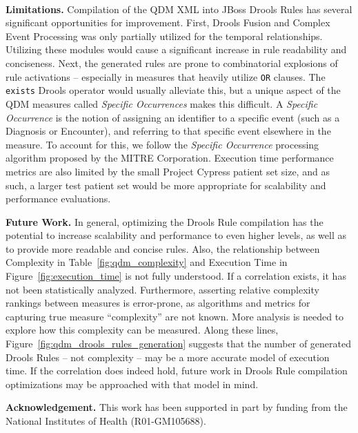 \documentclass{amia}
\begin{document}
\textbf{Limitations.}
Compilation of the QDM XML into JBoss\textsuperscript{\textregistered} Drools Rules has several significant opportunities for improvement. First, Drools Fusion and Complex Event Processing\cite{bali2013drools} was only partially utilized for the temporal relationships. Utilizing these modules would cause a significant increase in rule readability and conciseness. Next, the generated rules are prone to combinatorial explosions of rule activations -- especially in measures that heavily utilize \texttt{OR} clauses. The \texttt{exists} Drools operator would usually alleviate this, but a unique aspect of the QDM measures called \textit{Specific Occurrences} makes this difficult. A \textit{Specific Occurrence} is the notion of assigning an identifier to a specific event (such as a Diagnosis or Encounter), and referring to that specific event elsewhere in the measure. To account for this, we follow the \textit{Specific Occurrence} processing algorithm proposed by the MITRE Corporation\cite{specific_occurences}.
Execution time performance metrics are also limited by the small Project Cypress patient set size, and as such, a larger test patient set would be more appropriate for scalability and performance evaluations.

\textbf{Future Work.}
In general, optimizing the Drools Rule compilation has the potential to increase scalability and performance to even higher levels, as well as to provide more readable and concise rules.
Also, the relationship between Complexity in Table~\ref{fig:qdm_complexity} and Execution Time in Figure~\ref{fig:execution_time} is not fully understood. If a correlation exists, it has not been statistically analyzed. Furthermore, asserting relative complexity rankings between measures is error-prone, as algorithms and metrics for capturing true measure ``complexity'' are not known. More analysis is needed to explore how this complexity can be measured. Along these lines, Figure~\ref{fig:qdm_drools_rules_generation} suggests that the number of generated Drools Rules -- not complexity -- may be a more accurate model of execution time. If the correlation does indeed hold, future work in Drools Rule compilation optimizations may be approached with that model in mind.

\textbf{Acknowledgement.} This work has been supported in part by funding from the National Institutes of Health (R01-GM105688).


\setlength{\bibsep}{0.0pt}

\end{document}
